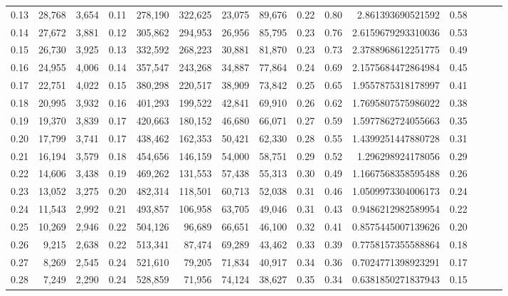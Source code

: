 \begin{tabular}{rrrrrrrrrrrrrrr}
0.13 &  28,768 &  3,654 &  0.11 &  278,190 &  322,625 &   23,075 &   89,676 &  0.22 &  0.80 &       2.861393690521592 &      0.58 \\
0.14 &  27,672 &  3,881 &  0.12 &  305,862 &  294,953 &   26,956 &   85,795 &  0.23 &  0.76 &      2.6159679293310036 &      0.53 \\
0.15 &  26,730 &  3,925 &  0.13 &  332,592 &  268,223 &   30,881 &   81,870 &  0.23 &  0.73 &      2.3788968612251775 &      0.49 \\
0.16 &  24,955 &  4,006 &  0.14 &  357,547 &  243,268 &   34,887 &   77,864 &  0.24 &  0.69 &      2.1575684472864984 &      0.45 \\
0.17 &  22,751 &  4,022 &  0.15 &  380,298 &  220,517 &   38,909 &   73,842 &  0.25 &  0.65 &      1.9557875318178997 &      0.41 \\
0.18 &  20,995 &  3,932 &  0.16 &  401,293 &  199,522 &   42,841 &   69,910 &  0.26 &  0.62 &      1.7695807575986022 &      0.38 \\
0.19 &  19,370 &  3,839 &  0.17 &  420,663 &  180,152 &   46,680 &   66,071 &  0.27 &  0.59 &      1.5977862724055663 &      0.35 \\
0.20 &  17,799 &  3,741 &  0.17 &  438,462 &  162,353 &   50,421 &   62,330 &  0.28 &  0.55 &      1.4399251447880728 &      0.31 \\
0.21 &  16,194 &  3,579 &  0.18 &  454,656 &  146,159 &   54,000 &   58,751 &  0.29 &  0.52 &       1.296298924178056 &      0.29 \\
0.22 &  14,606 &  3,438 &  0.19 &  469,262 &  131,553 &   57,438 &   55,313 &  0.30 &  0.49 &      1.1667568358595488 &      0.26 \\
0.23 &  13,052 &  3,275 &  0.20 &  482,314 &  118,501 &   60,713 &   52,038 &  0.31 &  0.46 &      1.0509973304006173 &      0.24 \\
0.24 &  11,543 &  2,992 &  0.21 &  493,857 &  106,958 &   63,705 &   49,046 &  0.31 &  0.43 &      0.9486212982589954 &      0.22 \\
0.25 &  10,269 &  2,946 &  0.22 &  504,126 &   96,689 &   66,651 &   46,100 &  0.32 &  0.41 &      0.8575445007139626 &      0.20 \\
0.26 &   9,215 &  2,638 &  0.22 &  513,341 &   87,474 &   69,289 &   43,462 &  0.33 &  0.39 &      0.7758157355588864 &      0.18 \\
0.27 &   8,269 &  2,545 &  0.24 &  521,610 &   79,205 &   71,834 &   40,917 &  0.34 &  0.36 &      0.7024771398923291 &      0.17 \\
0.28 &   7,249 &  2,290 &  0.24 &  528,859 &   71,956 &   74,124 &   38,627 &  0.35 &  0.34 &      0.6381850271837943 &      0.15 \\

\end{tabular}
